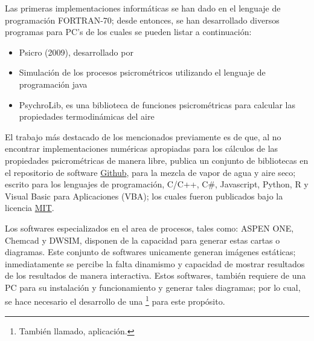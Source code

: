     Las primeras implementaciones informáticas se han dado en el lenguaje de programación FORTRAN-70; desde entonces, se han desarrollado diversos programas para PC's de los cuales se pueden listar a continuación:
    \begin{itemize}
        \item Psicro (2009),  desarrollado por \parencite{bib:Compagnon2010}
        \item Simulación de los procesos psicrométricos utilizando el lenguaje de programación java \parencite{bib:Cardoso2016}
        \item PsychroLib, es una biblioteca de funciones psicrométricas para calcular las propiedades termodinámicas del aire \parencite{bib:Meyer2019}
    \end{itemize}

    El trabajo más destacado de los mencionados previamente es de \textcite[]{bib:Meyer2019} que, al no encontrar implementaciones numéricas apropiadas para los cálculos de las propiedades psicrométricas de manera libre, publica un conjunto de bibliotecas en el repositorio de software \href{https://github.com/psychrometrics/psychrolib}{Github}, para la mezcla de vapor de agua y aire seco; escrito para los lenguajes de programación, C/C++, C\#, Javascript, Python, R y Visual Basic para Aplicaciones (VBA); los cuales fueron publicados bajo la licencia \href{https://github.com/psychrometrics/psychrolib/blob/master/LICENSE.txt}{MIT}. %

    Los softwares especializados en el area de procesos, tales como: ASPEN ONE, Chemcad y DWSIM, disponen de la capacidad para generar estas cartas o diagramas. Este conjunto de softwares unicamente generan imágenes estáticas; inmediatamente se percibe la falta dinamismo y capacidad de mostrar resultados de los resultados de manera interactiva. Estos softwares, también requiere de una PC para su instalación y funcionamiento y generar tales diagramas; por lo cual, se hace necesario el desarrollo de una \footnote{También llamado, aplicación.}  para este propósito. %






